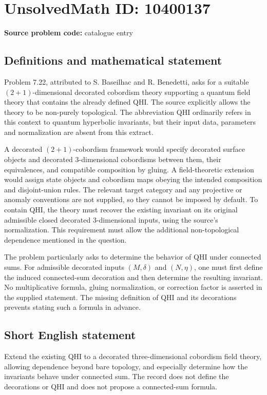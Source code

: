 \documentclass[11pt]{article}
\begin{document}
\section*{UnsolvedMath ID: 10400137}
\textbf{Source problem code:} catalogue entry
\subsection{Definitions and mathematical statement}
Problem 7.22, attributed to S. Baseilhac and R. Benedetti, asks for a suitable \((2+1)\)-dimensional decorated cobordism theory supporting a quantum field theory that contains the already defined QHI. The source explicitly allows the theory to be non-purely topological. The abbreviation QHI ordinarily refers in this context to quantum hyperbolic invariants, but their input data, parameters and normalization are absent from this extract.

A decorated \((2+1)\)-cobordism framework would specify decorated surface objects and decorated \(3\)-dimensional cobordisms between them, their equivalences, and compatible composition by gluing. A field-theoretic extension would assign state objects and cobordism maps obeying the intended composition and disjoint-union rules. The relevant target category and any projective or anomaly conventions are not supplied, so they cannot be imposed by default. To contain QHI, the theory must recover the existing invariant on its original admissible closed decorated \(3\)-dimensional inputs, using the source's normalization. This requirement must allow the additional non-topological dependence mentioned in the question.

The problem particularly asks to determine the behavior of QHI under connected sums. For admissible decorated inputs \((M,\delta)\) and \((N,\eta)\), one must first define the induced connected-sum decoration and then determine the resulting invariant. No multiplicative formula, gluing normalization, or correction factor is asserted in the supplied statement. The missing definition of QHI and its decorations prevents stating such a formula in advance.
\subsection{Short English statement}
Extend the existing QHI to a decorated three-dimensional cobordism field theory, allowing dependence beyond bare topology, and especially determine how the invariants behave under connected sum. The record does not define the decorations or QHI and does not propose a connected-sum formula.
\end{document}
